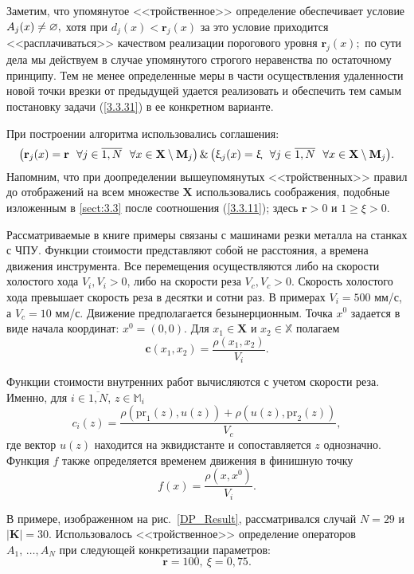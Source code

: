 Заметим, что упомянутое <<тройственное>> определение обеспечивает условие
$A_j(x) \neq \varnothing,$
хотя при $d_j(x) < \mathbf{r}_j(x)$
за это условие приходится <<расплачиваться>> качеством реализации порогового уровня
$\mathbf{r}_j(x);$
по сути дела мы действуем в случае упомянутого строгого
неравенства по остаточному принципу.
Тем не менее определенные меры в части
осуществления удаленности новой точки врезки от предыдущей удается реализовать 
и обеспечить тем самым постановку задачи (\ref{3.3.31})
в ее конкретном варианте.

При построении алгоритма использовались соглашения:
$$
  \bigl(\mathbf{r}_j(x) = \mathbf{r}\ \ \fa j\in \ov{1,N}\ \ \fa x\in
  \mathbf{X}\setminus \mathbf{M}_j\bigl)\,\&\,\bigl(\xi_j(x) = \xi\ \ \fa
  j\in \ov{1,N}\ \ \fa x\in \mathbf{X}\setminus \mathbf{M}_j\bigl)
  .
$$
Напомним, что при доопределении вышеупомянутых <<тройственных>> правил до
отображений на всем множестве $\mathbf{X}$ использовались соображения,
подобные изложенным в \ref{sect:3.3}
после соотношения (\ref{3.3.11});
здесь $\mathbf{r}>0$
и $1 \geqslant\xi >0$.

Рассматриваемые в книге примеры связаны с машинами резки металла на станках с ЧПУ.
Функции стоимости представляют собой не расстояния,
а времена движения инструмента.
Все перемещения осуществляются либо на скорости холостого хода $V_i,V_i>0$,
либо на скорости реза
$V_c, V_c > 0$.
Скорость холостого хода превышает скорость
реза в десятки и сотни раз.
В примерах $V_i=500$ мм/с, а $V_c=10$ мм/с.
Движение предполагается безынерционным.
Точка $x^0$ задается в виде начала координат:
$x^0=(0,0)$.
Для
$x_1\in \mathbf{X}$ и
$x_2\in \mathbb{X}$ полагаем
\begin{equation}
  \label{ExtPrice}
  \mathbf{c}(x_1,x_2)=\frac{\rho (x_1,x_2)}{V_i}
  .
\end{equation}

Функции стоимости внутренних работ вычисляются с учетом скорости реза.
Именно, для
$i\in \overline{1,N}$, $z\in \mathbb{M}_i$
$$
  c_i(z)=\frac{\rho(\mbox{pr}_1(z),u(z))+\rho(u(z),\mbox{pr}_2(z))}{V_c}
  ,
$$
где вектор $u(z)$
находится на эквидистанте и сопоставляется $z$ однозначно.
Функция $f$
также определяется временем движения в финишную точку
\begin{equation}
  \label{TerminalPrice}
  f(x)=\frac{\rho (x,x^0)}{V_i}
  .
\end{equation}

В примере,
изображенном на рис.~\ref{DP_Result},
рассматривался случай
\mbox{$N=29$} и
$|\mathbf{K}| =30$.
Использовалось <<тройственное>> определение операторов
$A_1,\,\ldots,A_N$
при следующей конкретизации параметров:
$$
  \mathbf{r}=100,\ \xi=0,75
  .
$$

